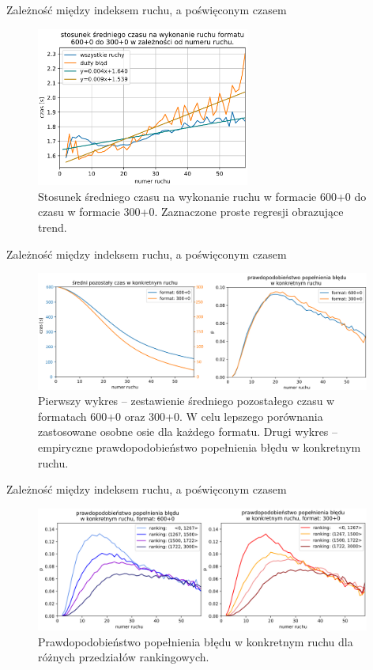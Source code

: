 \documentclass{beamer}
\begin{document}
\begin{frame}{Zależność między indeksem ruchu, a poświęconym czasem}
\begin{figure}[H]
	\centering
	\includegraphics[width=7cm]{../Formatka/stosunek_sr_czas.png}
	\caption{Stosunek średniego czasu na wykonanie ruchu w formacie 600+0 do czasu w formacie 300+0. Zaznaczone proste regresji obrazujące trend.}
	\label{rys:stosunek_sr_czas}
\end{figure}
\end{frame}


\begin{frame}{Zależność między indeksem ruchu, a poświęconym czasem}
	\begin{figure}[H]
		\centering
		\includegraphics[width=11cm]{../Formatka/pozostaly_czas.png}
		\caption{
			Pierwszy wykres -- zestawienie średniego pozostałego czasu w formatach 600+0 oraz 300+0. W celu lepszego porównania zastosowane osobne osie dla każdego formatu. Drugi wykres -- empiryczne prawdopodobieństwo popełnienia błędu w konkretnym ruchu.}
		\label{rys:pozostaly_czas}
	\end{figure}
\end{frame}

\begin{frame}{Zależność między indeksem ruchu, a poświęconym czasem}
\begin{figure}[H]
	\centering
	\includegraphics[width=11cm]{../Formatka/prawd_blad_ELO.png}
	\caption{Prawdopodobieństwo popełnienia błędu w konkretnym ruchu dla różnych przedziałów rankingowych.}
	\label{rys:prawd_blad_ELO}
\end{figure}
\end{frame}
\end{document}

